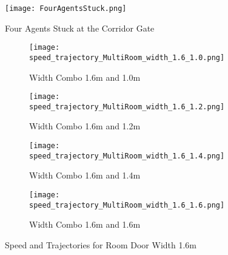 \begin{figure}
    \centering
    \texttt{[image: FourAgentsStuck.png]}
    \caption{Four Agents Stuck at the Corridor Gate}
    \label{fig:four_agents_stuck}
\end{figure}

\begin{figure}[h]
    \centering
        \begin{subfigure}[b]{.45\linewidth}
        \texttt{[image: 
            speed\_trajectory\_MultiRoom\_width\_1.6\_1.0.png]}
        \caption{Width Combo 1.6m and 1.0m}
        \label{fig:width_combo_1.6_1.0m}
    \end{subfigure}
    \begin{subfigure}[b]{.45\linewidth}
        \texttt{[image: 
            speed\_trajectory\_MultiRoom\_width\_1.6\_1.2.png]}
        \caption{Width Combo 1.6m and 1.2m}
        \label{fig:width_combo_1.6_1.2m}
    \end{subfigure}

    \begin{subfigure}[b]{.45\linewidth}
        \texttt{[image: 
            speed\_trajectory\_MultiRoom\_width\_1.6\_1.4.png]}
        \caption{Width Combo 1.6m and 1.4m}
        \label{fig:width_combo_1.6_1.4m}
    \end{subfigure}
        \begin{subfigure}[b]{.45\linewidth}
        \texttt{[image: 
            speed\_trajectory\_MultiRoom\_width\_1.6\_1.6.png]}
        \caption{Width Combo 1.6m and 1.6m}
        \label{fig:width_combo_1.6_1.6m}
    \end{subfigure}

    \caption{Speed and Trajectories for Room Door Width 1.6m}
    \label{fig:width_combo_1.6_x}
\end{figure}